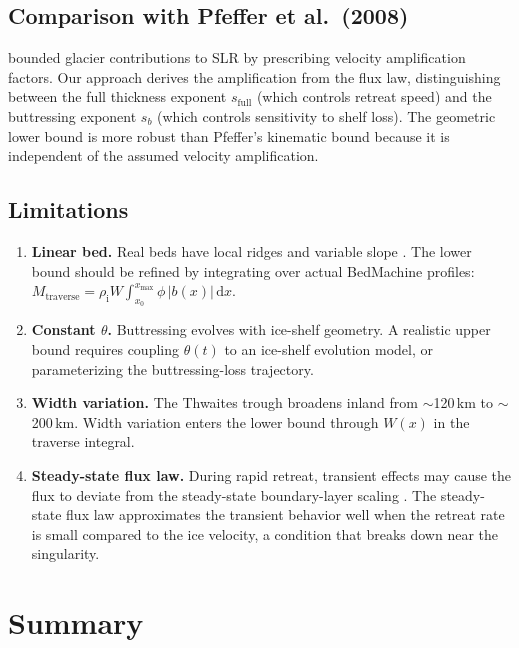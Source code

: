 \documentclass[11pt]{article}
\newcommand{\dd}{\mathrm{d}}
\newcommand{\rhoi}{\rho_{\mathrm{i}}}
\begin{document}
\subsection{Comparison with Pfeffer et al.\ (2008)}

\citet{Pfeffer2008} bounded glacier contributions to SLR by prescribing velocity amplification factors. Our approach derives the amplification from the flux law, distinguishing between the full thickness exponent $s_{\mathrm{full}}$ (which controls retreat speed) and the buttressing exponent $s_b$ (which controls sensitivity to shelf loss). The geometric lower bound is more robust than Pfeffer's kinematic bound because it is independent of the assumed velocity amplification.

\subsection{Limitations}

\begin{enumerate}
	\item \textbf{Linear bed.} Real beds have local ridges and variable slope \citep{Morlighem2020}. The lower bound should be refined by integrating over actual BedMachine profiles: $M_{\mathrm{traverse}} = \rhoi W \int_{x_0}^{x_{\max}} \phi\, |b(x)|\,\dd x$.

	\item \textbf{Constant $\theta$.} Buttressing evolves with ice-shelf geometry. A realistic upper bound requires coupling $\theta(t)$ to an ice-shelf evolution model, or parameterizing the buttressing-loss trajectory.

	\item \textbf{Width variation.} The Thwaites trough broadens inland from $\sim$120\,km to $\sim$200\,km. Width variation enters the lower bound through $W(x)$ in the traverse integral.

	\item \textbf{Steady-state flux law.} During rapid retreat, transient effects may cause the flux to deviate from the steady-state boundary-layer scaling \citep{Schoof2012, HaseloffSergienko2022}. The steady-state flux law approximates the transient behavior well when the retreat rate is small compared to the ice velocity, a condition that breaks down near the singularity.
\end{enumerate}


\section*{Summary}
\end{document}
